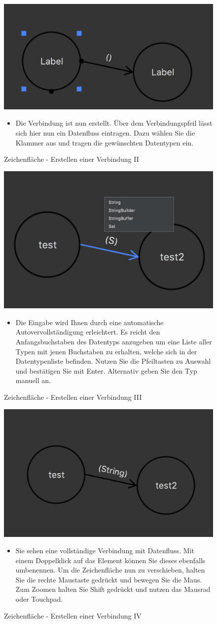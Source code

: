 \begin{figure}[h!]
	\centering
	\includegraphics[width=.4\textwidth]{Zeichenflaeche_Basics2.png}
	\caption{Zeichenfläche - Erstellen einer Verbindung II}	
\begin{itemize}	
\item Die Verbindung ist nun erstellt. Über dem Verbindungspfeil lässt sich hier nun ein Datenfluss eintragen. Dazu wählen Sie die Klammer aus und tragen die gewünschten Datentypen ein. 
\end{itemize}
\end{figure}

\begin{figure}[h!]
	\centering
	\includegraphics[width=.4\textwidth]{Zeichenflaeche_Basics3.png}
	\caption{Zeichenfläche - Erstellen einer Verbindung III}	
\begin{itemize}	
\item Die Eingabe wird Ihnen durch eine automatische Autovervollständigung erleichtert. Es reicht den Anfangsbuchstaben des Datentyps anzugeben um eine Liste aller Typen mit jenen Buchstaben zu erhalten, welche sich in der Datentypenliste befinden. Nutzen Sie die Pfeiltasten zu Auswahl und bestätigen Sie mit Enter. Alternativ geben Sie den Typ manuell an.
\end{itemize}
\end{figure}

\begin{figure}[h!]
	\centering
	\includegraphics[width=.4\textwidth]{Zeichenflaeche_Basics4.png}
	\caption{Zeichenfläche - Erstellen einer Verbindung IV}	
\begin{itemize}	
\item Sie sehen eine vollständige Verbindung mit Datenfluss. Mit einem Doppelklick auf das Element können Sie dieses ebenfalls umbenennen. Um die Zeichenfläche nun zu verschieben, halten Sie die rechte Maustaste gedrückt und bewegen Sie die Maus. Zum Zoomen halten Sie Shift gedrückt und nutzen das Mausrad oder Touchpad.
\end{itemize}
\end{figure}

